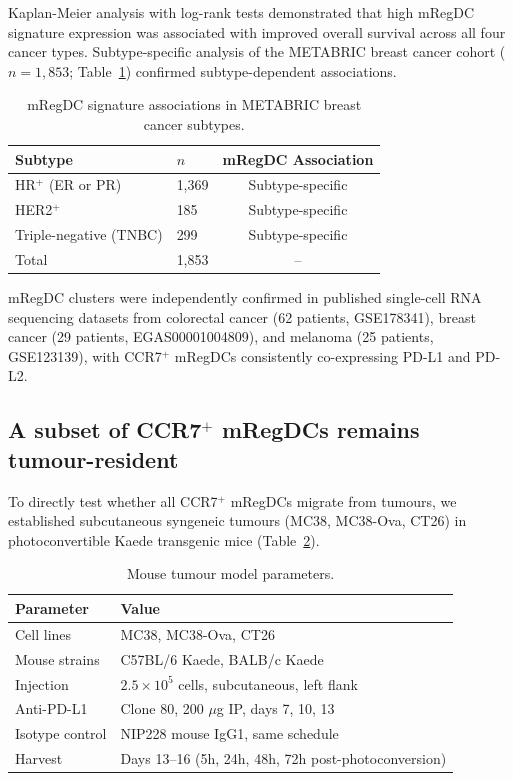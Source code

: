 \documentclass[11pt]{article}
\begin{document}
Kaplan-Meier analysis with log-rank tests demonstrated that high mRegDC signature expression was associated with improved overall survival across all four cancer types. Subtype-specific analysis of the METABRIC breast cancer cohort ($n = 1{,}853$; Table~\ref{tab:metabric}) confirmed subtype-dependent associations.

\begin{table}[ht]
\centering
\caption{mRegDC signature associations in METABRIC breast cancer subtypes.}
\label{tab:metabric}
\begin{tabular}{llc}
\toprule
Subtype & $n$ & mRegDC Association \\
\midrule
HR$^{+}$ (ER or PR) & 1,369 & Subtype-specific \\
HER2$^{+}$ & 185 & Subtype-specific \\
Triple-negative (TNBC) & 299 & Subtype-specific \\
\midrule
Total & 1,853 & -- \\
\bottomrule
\end{tabular}
\end{table}

mRegDC clusters were independently confirmed in published single-cell RNA sequencing datasets from colorectal cancer (62 patients, GSE178341), breast cancer (29 patients, EGAS00001004809), and melanoma (25 patients, GSE123139), with CCR7$^{+}$ mRegDCs consistently co-expressing PD-L1 and PD-L2.

\subsection{A subset of CCR7$^{+}$ mRegDCs remains tumour-resident}

To directly test whether all CCR7$^{+}$ mRegDCs migrate from tumours, we established subcutaneous syngeneic tumours (MC38, MC38-Ova, CT26) in photoconvertible Kaede transgenic mice (Table~\ref{tab:models}).

\begin{table}[ht]
\centering
\caption{Mouse tumour model parameters.}
\label{tab:models}
\begin{tabular}{ll}
\toprule
Parameter & Value \\
\midrule
Cell lines & MC38, MC38-Ova, CT26 \\
Mouse strains & C57BL/6 Kaede, BALB/c Kaede \\
Injection & $2.5 \times 10^{5}$ cells, subcutaneous, left flank \\
Anti-PD-L1 & Clone 80, 200 $\mu$g IP, days 7, 10, 13 \\
Isotype control & NIP228 mouse IgG1, same schedule \\
Harvest & Days 13--16 (5h, 24h, 48h, 72h post-photoconversion) \\
\bottomrule
\end{tabular}
\end{table}
\end{document}
